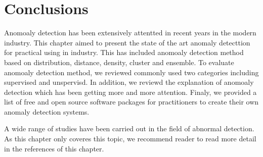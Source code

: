 \section{Conclusions} \label{sec-conclusions}

Anomoaly detection has been extensively
attentted in recent years in the modern industry.
This chapter aimed to present the state of the art
anomaly detecttion for practical using in industry.
This has included anomoaly detection method based on distribution,
distance,
density,
cluster and ensemble.
To evaluate anomoaly detection method,
we reviewed commonly used
two categories including supervised and unspervisd.
In addition,
we reviewd the explanation of anomoaly detection which
has been getting more and more attention.
Finaly,
we provided a list of free and open source software packages for
practitioners to create their own anomaly detection systems.

A wide range of studies have been carried out in the field of abnormal detection. 
As this chapter only coveres this topic, 
we recommend reader to read more detail in the references of this chapter.







